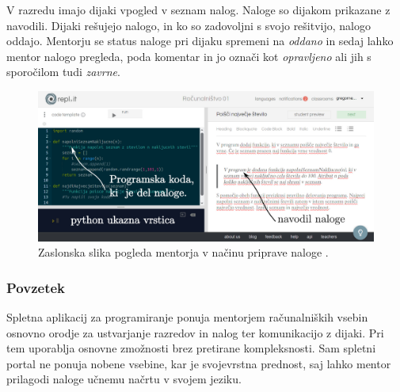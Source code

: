 V razredu imajo dijaki vpogled v seznam nalog. Naloge so dijakom
prikazane z navodili. Dijaki rešujejo nalogo, in ko so zadovoljni s
svojo rešitvijo, nalogo oddajo. Mentorju se status naloge pri dijaku
spremeni na \emph{oddano} in sedaj lahko mentor nalogo pregleda, poda
komentar in jo označi kot \emph{opravljeno} ali jih s sporočilom tudi
\emph{zavrne}.

\begin{figure}[h!]
  \centering
    \includegraphics [width=0.65\linewidth, keepaspectratio =
   1] {./images/sc_web/replIT_assigment-v01.jpg}
   \caption{Zaslonska slika pogleda mentorja v načinu priprave naloge
     \cite{web:replIT}.}
    \label{fig:web:replIT:assigment}
\end{figure}

\subsubsection{Povzetek}
\label{sec:povzetek:replIT}

Spletna aplikacij za programiranje ponuja mentorjem računalniških
vsebin osnovno orodje za ustvarjanje razredov in nalog ter
komunikacijo z dijaki. Pri tem uporablja osnovne zmožnosti brez
pretirane kompleksnosti. Sam spletni portal ne ponuja nobene vsebine,
kar je svojevrstna prednost, saj lahko mentor prilagodi naloge učnemu
načrtu v svojem jeziku.

